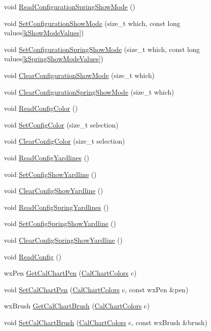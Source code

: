 \begin{DoxyCompactItemize}
\item 
void \hyperlink{a00190_abf08a16ff51a85dbeb975987d91c510e}{Read\-Configuration\-Spring\-Show\-Mode} ()
\item 
void \hyperlink{a00190_a10e2f95aeedd16a7934badbd0d1d8fa7}{Set\-Configuration\-Show\-Mode} (size\-\_\-t which, const long values\mbox{[}\hyperlink{a00191_a9f04f33b4133efadaca3371489a3e3e0}{k\-Show\-Mode\-Values}\mbox{]})
\item 
void \hyperlink{a00190_a594f1e68b0d6f4780721bc3e358dfdde}{Set\-Configuration\-Spring\-Show\-Mode} (size\-\_\-t which, const long values\mbox{[}\hyperlink{a00191_ad4adeccc0bb8604edd3f05ef8e639fcd}{k\-Spring\-Show\-Mode\-Values}\mbox{]})
\item 
void \hyperlink{a00190_a3ea3a157dc8aac53a5cc0ef7c98fc132}{Clear\-Configuration\-Show\-Mode} (size\-\_\-t which)
\item 
void \hyperlink{a00190_a0ac3d07d81bcdb5f7d9e567d3a2247a2}{Clear\-Configuration\-Spring\-Show\-Mode} (size\-\_\-t which)
\item 
void \hyperlink{a00190_afb51edc71244ee3c2a67113dcfa51cae}{Read\-Config\-Color} ()
\item 
void \hyperlink{a00190_a8e117024f9137a2b91cb79ec709c700c}{Set\-Config\-Color} (size\-\_\-t selection)
\item 
void \hyperlink{a00190_a67d9b5e1079a712f7453b66e8cd180f0}{Clear\-Config\-Color} (size\-\_\-t selection)
\item 
void \hyperlink{a00190_a86768312ca622018337d1fc8db4912d7}{Read\-Config\-Yardlines} ()
\item 
void \hyperlink{a00190_acc7103c8f611f5953464b72b11f40a85}{Set\-Config\-Show\-Yardline} ()
\item 
void \hyperlink{a00190_a74c2e3e4c6cc66f4e171145c2c86d62d}{Clear\-Config\-Show\-Yardline} ()
\item 
void \hyperlink{a00190_a4d37f11bb3e55582b1d1e9b8fa6661c8}{Read\-Config\-Spring\-Yardlines} ()
\item 
void \hyperlink{a00190_ad95a644f19c43ace116585d304ed3f73}{Set\-Config\-Spring\-Show\-Yardline} ()
\item 
void \hyperlink{a00190_a1604ee464bf4a87ccee24cdf5349d2b6}{Clear\-Config\-Spring\-Show\-Yardline} ()
\item 
void \hyperlink{a00190_a9440abccb89bacd8863562948fe06a64}{Read\-Config} ()
\item 
wx\-Pen \hyperlink{a00190_aedf2f07f030bd57f63a968808935a585}{Get\-Cal\-Chart\-Pen} (\hyperlink{a00191_a09f513be9cbd80355eda10ee8e4059e2}{Cal\-Chart\-Colors} c)
\item 
void \hyperlink{a00190_a0693ce4e33c0276aeece02b9d4bb77ff}{Set\-Cal\-Chart\-Pen} (\hyperlink{a00191_a09f513be9cbd80355eda10ee8e4059e2}{Cal\-Chart\-Colors} c, const wx\-Pen \&pen)
\item 
wx\-Brush \hyperlink{a00190_a553f7a0424cc3276b8bbf7195e567806}{Get\-Cal\-Chart\-Brush} (\hyperlink{a00191_a09f513be9cbd80355eda10ee8e4059e2}{Cal\-Chart\-Colors} c)
\item 
void \hyperlink{a00190_a582137aaac5b3c454db5608e60c3a0a8}{Set\-Cal\-Chart\-Brush} (\hyperlink{a00191_a09f513be9cbd80355eda10ee8e4059e2}{Cal\-Chart\-Colors} c, const wx\-Brush \&brush)
\end{DoxyCompactItemize}
